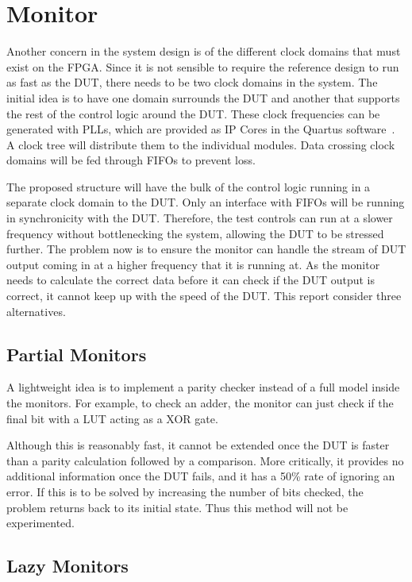 \section{Monitor}

Another concern in the system design is of the different clock domains that must exist on the FPGA.
Since it is not sensible to require the reference design to run as fast as the DUT, there needs to be two clock domains in the system.
The initial idea is to have one domain surrounds the DUT and another that supports the rest of the control logic around the DUT.
These clock frequencies can be generated with PLLs, which are provided as IP Cores in the Quartus software~\cite{Altera4}.
A clock tree will distribute them to the individual modules.
Data crossing clock domains will be fed through FIFOs to prevent loss.

The proposed structure will have the bulk of the control logic running in a separate clock domain to the DUT.
Only an interface with FIFOs will be running in synchronicity with the DUT.
Therefore, the test controls can run at a slower frequency without bottlenecking the system, allowing the DUT to be stressed further.
The problem now is to ensure the monitor can handle the stream of DUT output coming in at a higher frequency that it is running at.
As the monitor needs to calculate the correct data before it can check if the DUT output is correct, it cannot keep up with the speed of the DUT.
This report consider three alternatives.

\subsection{Partial Monitors}
A lightweight idea is to implement a parity checker instead of a full model inside the monitors.
For example, to check an adder, the monitor can just check if the final bit with a LUT acting as a XOR gate.

Although this is reasonably fast, it cannot be extended once the DUT is faster than a parity calculation followed by a comparison.
More critically, it provides no additional information once the DUT fails, and it has a 50\% rate of ignoring an error.
If this is to be solved by increasing the number of bits checked, the problem returns back to its initial state.
Thus this method will not be experimented.

\subsection{Lazy Monitors}

